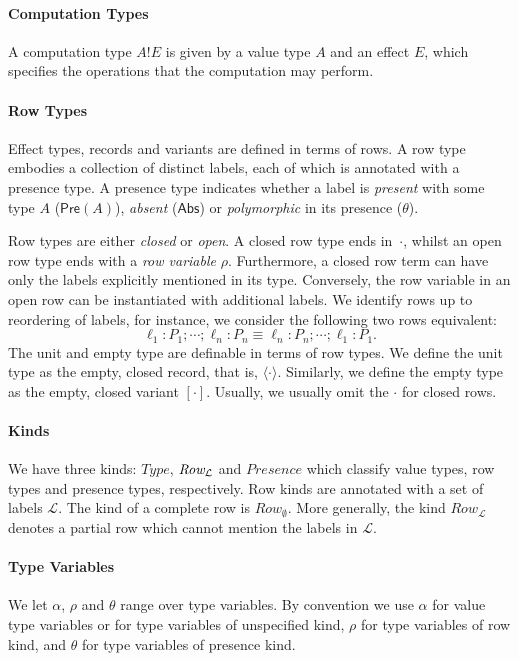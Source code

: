 \documentclass[12pt,mscres,cdtppar,twoside,openright,logo,rightchapter,normalheadings]{infthesis}
\theoremstyle{definition}
\newcommand{\Record}[1]{\ensuremath{\langle #1 \rangle}}
\newcommand{\Pre}[1]{\mathsf{Pre}(#1)}
\newcommand{\Abs}{\mathsf{Abs}}
\newcommand{\eff}{!}
\begin{document}
\paragraph{Computation Types}
A computation type $A \eff E$ is given by a value type $A$ and an
effect $E$, which specifies the operations that the computation may
perform.

\paragraph{Row Types}
Effect types, records and variants are defined in terms of rows.
A row type embodies a collection of distinct labels, each of which is
annotated with a presence type. A presence type indicates whether a
label is \emph{present} with some type $A$ ($\Pre{A}$), \emph{absent}
($\Abs$) or \emph{polymorphic} in its presence ($\theta$).

Row types are either \emph{closed} or \emph{open}. A closed row type
ends in~$\cdot$, whilst an open row type ends with a \emph{row
  variable} $\rho$. Furthermore, a closed row term can have only the
labels explicitly mentioned in its type. Conversely, the row variable
in an open row can be instantiated with additional labels. We identify
rows up to reordering of labels, for instance, we consider the
following two rows equivalent:
\[ \ell_1 : P_1; \cdots; \ell_n : P_n \equiv \ell_n : P_n; \cdots ; \ell_1 : P_1. \]
The unit and empty type are definable in terms of row types. We define
the unit type as the empty, closed record, that is,
$\Record{\cdot}$. Similarly, we define the empty type as the empty,
closed variant $[\cdot]$. Usually, we usually omit the $\cdot$ for
closed rows.

\paragraph{Kinds}
We have three kinds: $Type$, $\emph{Row}_\mathcal{L}$ and $Presence$
which classify value types, row types and presence types,
respectively. Row kinds are annotated with a set of labels
$\mathcal{L}$. The kind of a complete row is
$Row_{\mathcal{\emptyset}}$. More generally, the kind
$Row_{\mathcal{L}}$ denotes a partial row which cannot mention the
labels in $\mathcal{L}$.
%

\paragraph{Type Variables}
We let $\alpha$, $\rho$ and $\theta$ range over type variables. By
convention we use $\alpha$ for value type variables or for type
variables of unspecified kind, $\rho$ for type variables of row kind,
and $\theta$ for type variables of presence kind.
\end{document}
